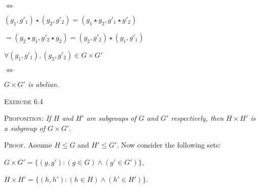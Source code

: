 \documentclass[12pt, a4paper]{article}
\begin{document}
\vspace{2mm}

        \centerline{$\Leftrightarrow$}
        
\vspace{2mm}

        \centerline{$(g_1,g'_1)\star(g_2,g'_2)=(g_1\star g_2,g'_1\star g'_2)$}\par
        
\vspace{2mm}

        \centerline{$=(g_2\star g_1,g'_2\star g_2)=(g_2,g'_2)\star(g_1,g'_1)$}\par
        
\vspace{2mm}

        \centerline{$\forall (g_1,g'_1),(g_2,g'_2)\in G\times G'$}\par
        
\vspace{2mm}

        \centerline{$\Leftrightarrow$}
        
\vspace{2mm}

        \centerline{\textit{$G\times G'$ is abelian.}}

\vspace{6mm}

\begin{flushleft}
\textsc{Exercise 6.4}
\end{flushleft}

    \textsc{Proposition: }\textit{If $H$ and $H'$ are subgroups of $G$ and $G'$ respectively, then $H\times H'$ is a subgroup of $G\times G'$}.
    
\vspace{4mm}

    \textsc{Proof. }Assume $H\leqslant G$ and $H'\leqslant G'$. Now consider the following sets:\par
    
\vspace{6mm}

        \centerline{$G\times G'=\{(g,g')\colon (g\in G)\wedge(g'\in G')\}$,}\par
        
\vspace{2mm}

        \centerline{$H\times H'=\{(h,h')\colon (h\in H)\wedge(h'\in H')\}$.}\par
        
\end{document}
